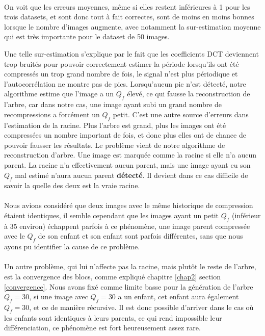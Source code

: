 \documentclass[utf8,final]{stageM2R} %
\begin{document}
\paragraph{}
On voit que les erreurs moyennes, même si elles restent inférieures à 1 pour les trois datasets, et sont donc tout à fait correctes, sont de moins en moins bonnes lorsque le nombre d'images augmente, avec notamment la sur-estimation moyenne qui est très importante pour le dataset de 50 images.

Une telle sur-estimation s'explique par le fait que les coefficients DCT deviennent trop bruités pour pouvoir correctement estimer la période lorsqu'ils ont été compressés un trop grand nombre de fois, le signal n'est plus périodique et l'autocorrélation ne montre pas de pics. Lorsqu'aucun pic n'est détecté, notre algorithme estime que l'image a un $Q_f$ élevé, ce qui fausse la reconstruction de l'arbre, car dans notre cas, une image ayant subi un grand nombre de recompressions a forcément un $Q_f$ petit. C'est une autre source d'erreurs dans l'estimation de la racine. Plus l'arbre est grand, plus les images ont été compressées un nombre important de fois, et donc plus elles ont de chance de pouvoir fausser les résultats. Le problème vient de notre algorithme de reconstruction d'arbre. Une image est marquée comme la racine si elle n'a aucun parent. La racine n'a effectivement aucun parent, mais une image ayant eu son $Q_f$ mal estimé n'aura aucun parent \textbf{détecté}. Il devient dans ce cas difficile de savoir la quelle des deux est la vraie racine.
\paragraph{}

Nous avions considéré que deux images avec le même historique de compression étaient identiques, il semble cependant que les images ayant un petit $Q_f$ (inférieur à 35 environ) échappent parfois à ce phénomène, une image parent compressée avec le $Q_f$ de son enfant et son enfant sont parfois différentes, sans que nous ayons pu identifier la cause de ce problème.
\paragraph{}

Un autre problème, qui lui n'affecte pas la racine, mais plutôt le reste de l'arbre, est la convergence des blocs, comme expliqué chapitre \ref{chap2} section \ref{convergence}. Nous avons fixé comme limite basse pour la génération de l'arbre $Q_f = 30$, si une image avec $Q_f = 30$ a un enfant, cet enfant aura également $Q_f = 30$, et ce de manière récursive. Il est donc possible d'arriver dans le cas où les enfants sont identiques à leurs parents, ce qui rend impossible leur différenciation, ce phénomène est fort heureusement assez rare.
\end{document}
